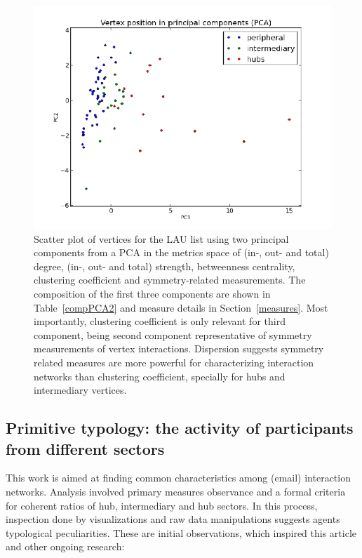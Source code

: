 \documentclass[%
 aip,
 jmp,%
 amsmath,amssymb,
 reprint,%
]{revtex4-1}
\begin{document}
\begin{figure} 
   \centering
        \includegraphics[width=\columnwidth]{figs/ev0pr1PCA}
    \caption{Scatter plot of vertices for the LAU list using two principal components from a PCA in the metrics space of (in-,  out- and total) degree, (in-,  out- and total) strength, betweenness centrality, clustering coefficient and symmetry-related measurements. The composition of the first three components are shown in Table~\ref{compPCA2} and measure details in Section~\ref{measures}. Most importantly, clustering coefficient is only relevant for third component, being second component representative of symmetry measurements of vertex interactions. Dispersion suggests symmetry related measures are more powerful for characterizing interaction networks than clustering coefficient, specially for hubs and intermediary vertices.}
    \label{PCA2}
\end{figure}

    \subsection{Primitive typology: the activity of participants from different sectors}\label{sec:pty}

This work is aimed at finding common characteristics among (email) interaction networks. Analysis involved primary measures observance and a formal criteria for coherent ratios of hub, intermediary and hub sectors. In this process, inspection done by visualizations and raw data manipulations suggests agents typological peculiarities. These are initial observations, which inspired this article and other ongoing research:
\end{document}

